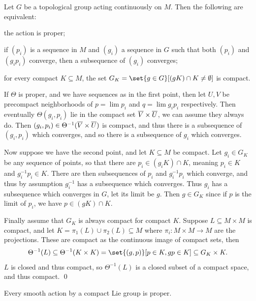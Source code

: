 \eproof

\blemm

    Let $G$ be a topological group acting continuously on $M$.
    Then the following are equivalent:
    \benum
        \item the action is proper;
        \item if $(p_i)$ is a sequence in $M$ and $(g_i)$ a sequence in $G$ such that both $(p_i)$ and $(g_ip_i)$ converge, then a subsequence
        of $(g_i)$ converges;
        \item for every compact $K\subseteq M$, the set $G_K=\set{g\in G}[(gK)\cap K\neq\emptyset]$ is compact.
    \eenum

\elemm

\bproof

    If $\Theta$ is proper, and we have sequences as in the first point, then let $U,V$ be precompact neighborhoods of $p=\lim p_i$ and
    $q=\lim g_ip_i$ respectively.
    Then eventually $\Theta(g_i,p_i)$ lie in the compact set $\overline V\times\overline U$, we can assume they always do.
    Then $(g_i,p_i)\in\Theta^{-1}(\overline V\times\overline U)$ is compact, and thus there is a subsequence of $(g_i,p_i)$ which converges, and so there
    is a subsequence of $g_i$ which converges.

    Now suppose we have the second point, and let $K\subseteq M$ be compact.
    Let $g_i\in G_K$ be any sequence of points, so that there are $p_i\in(g_iK)\cap K$, meaning $p_i\in K$ and $g_i^{-1}p_i\in K$.
    There are then subsequences of $p_i$ and $g_i^{-1}p_i$ which converge, and thus by assumption $g_i^{-1}$ has a subsequence which converges.
    Thus $g_i$ has a subsequence which converges in $G$, let its limit be $g$.
    Then $g\in G_K$ since if $p$ is the limit of $p_i$, we have $p\in(gK)\cap K$.

    Finally assume that $G_K$ is always compact for compact $K$.
    Suppose $L\subseteq M\times M$ is compact, and let $K=\pi_1(L)\cup\pi_2(L)\subseteq M$ where $\pi_i\colon M\times M\to M$ are the projections.
    These are compact as the continuous image of compact sets, then
    $$ \Theta^{-1}(L) \subseteq \Theta^{-1}(K\times K) = \set{(g,p)}[p\in K,gp\in K] \subseteq G_K\times K . $$
    $L$ is closed and thus compact, so $\Theta^{-1}(L)$ is a closed subset of a compact space, and thus compact.
    \qed

\eproof

\bcoro

    Every smooth action by a compact Lie group is proper.

